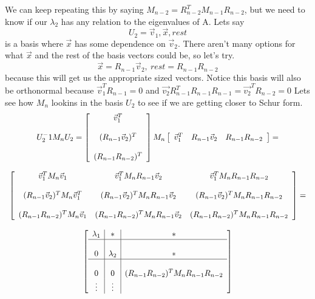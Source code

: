 \documentclass{article}
\begin{document}
We can keep repeating this by saying $M_{n-2} = R_{n-2}^T M_{n-1} R_{n-2}$, but we need to know if our $\lambda_2$ has any relation to the eigenvalues of A.
Lets say $$U_2 = \vec{v}_1, \vec{x}, rest$$ is a basis where $\vec{x}$ has some dependence on $\vec{v}_2$.
There aren't many options for what $\vec{x}$ and the rest of the basis vectors could be, so let's try.
$$\vec{x}=R_{n-1}\vec{v}_2,\ rest = R_{n-1}R_{n-2}$$ because this will get us the appropriate sized vectors.
Notice this basis will also be orthonormal because $\vec{v}_1^T R_{n-1}=0$ and $\vec{v_2}R_{n-1}^TR_{n-1}R_{n-1}=\vec{v_2}^TR_{n-2}=0$
Lets see how $M_n$ lookins in the basis $U_2$ to see if we are getting closer to Schur form.
\[
    \begin{array}{c}
        U_2^-1M_nU_2 = 
        \left[
            \begin{array}{c}
                \vec{v}_1^T \\\\
                (R_{n-1}\vec{v}_2)^T\\\\
                (R_{n-1}R_{n-2})^T
            \end{array}
        \right]
        M_n
        \left[
            \begin{array}{ccc}
                \vec{v}_1^T & R_{n-1}\vec{v}_2 & R_{n-1}R_{n-2}
            \end{array}
        \right] = \\\\
        \left[
            \begin{array}{ccc}
                \vec{v}_1^T M_n \vec{v}_1 & \vec{v}_1^T M_n R_{n-1}\vec{v}_2 & \vec{v}_1^T M_n R_{n-1}R_{n-2}\\\\
                (R_{n-1}\vec{v}_2)^T M_n \vec{v}_1^T & (R_{n-1}\vec{v}_2)^T M_n R_{n-1}\vec{v}_2 & (R_{n-1}\vec{v}_2)^T M_n R_{n-1}R_{n-2}\\\\
                (R_{n-1}R_{n-2})^T M_n \vec{v}_1 & (R_{n-1}R_{n-2})^T M_n R_{n-1}\vec{v}_2 & (R_{n-1}R_{n-2})^T M_n R_{n-1}R_{n-2}
            \end{array}
        \right] = \\\\
        \left[
            \begin{array}{c|c|c}
                \lambda_1 & *  & *\\
                \hline & &\\
                0 & \lambda_2 & *\\
                \hline & &\\
                0 & 0 & (R_{n-1}R_{n-2})^T M_n R_{n-1}R_{n-2}\\
                \vdots & \vdots
            \end{array}
        \right]
    \end{array}
\]
\end{document}
